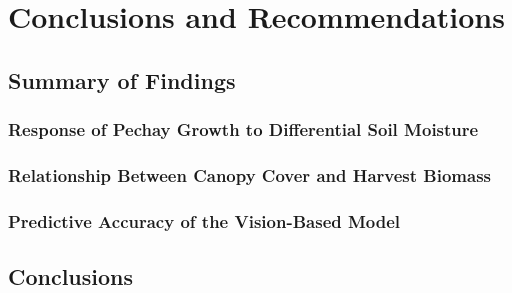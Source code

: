 %

\chapter{Conclusions and Recommendations}
\label{chap:conclusion}

\section{Summary of Findings}


\subsection{Response of Pechay Growth to Differential Soil Moisture}

\subsection{Relationship Between Canopy Cover and Harvest Biomass}

\subsection{Predictive Accuracy of the Vision-Based Model}

\section{Conclusions}


